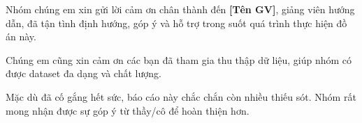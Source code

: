 Nhóm chúng em xin gửi lời cảm ơn chân thành đến \textbf{[Tên GV]}, giảng viên hướng dẫn,
đã tận tình định hướng, góp ý và hỗ trợ trong suốt quá trình thực hiện đồ án này.

Chúng em cũng xin cảm ơn các bạn đã tham gia thu thập dữ liệu,
giúp nhóm có được dataset đa dạng và chất lượng.

Mặc dù đã cố gắng hết sức, báo cáo này chắc chắn còn nhiều thiếu sót.
Nhóm rất mong nhận được sự góp ý từ thầy/cô để hoàn thiện hơn.
